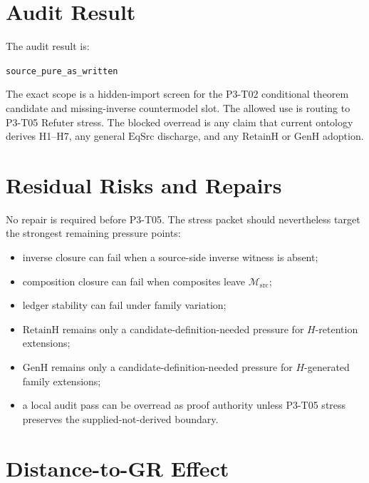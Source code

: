 \documentclass[11pt]{article}
\newcommand{\EqSrc}{\mathrm{EqSrc}}
\newcommand{\RetainH}{\mathrm{RetainH}}
\newcommand{\GenH}{\mathrm{GenH}}
\newcommand{\Msrc}{\mathcal{M}_{\mathrm{src}}}
\begin{document}
\section{Audit Result}

The audit result is:

\begin{center}
\texttt{source\_pure\_as\_written}
\end{center}

The exact scope is a hidden-import screen for the P3-T02 conditional theorem
candidate and missing-inverse countermodel slot. The allowed use is routing to
P3-T05 Refuter stress. The blocked overread is any claim that current ontology
derives H1--H7, any general \(\EqSrc\) discharge, and any RetainH or GenH
adoption.

\section{Residual Risks and Repairs}

No repair is required before P3-T05. The stress packet should nevertheless
target the strongest remaining pressure points:
\begin{itemize}[leftmargin=*]
  \item inverse closure can fail when a source-side inverse witness is absent;
  \item composition closure can fail when composites leave \(\Msrc\);
  \item ledger stability can fail under family variation;
  \item \(\RetainH\) remains only a candidate-definition-needed pressure for
  \(H\)-retention extensions;
  \item \(\GenH\) remains only a candidate-definition-needed pressure for
  \(H\)-generated family extensions;
  \item a local audit pass can be overread as proof authority unless P3-T05
  stress preserves the supplied-not-derived boundary.
\end{itemize}

\section{Distance-to-GR Effect}
\end{document}
